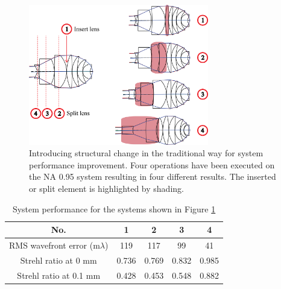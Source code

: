 \begin{figure}[h!]
    \centering
    \includegraphics[width=0.7\textwidth]{chapter-4/figures/Vollrath_NATradition.png}
    \caption{Introducing structural change in the traditional way for system performance improvement. Four operations have been executed on the NA 0.95 system resulting in four different results. The inserted or split element is highlighted by shading.}
    \label{fig: vollrathNAtrad}
\end{figure}

\setlength{\arrayrulewidth}{.5mm}
\setlength{\tabcolsep}{18pt}
\renewcommand{\arraystretch}{1.2}
\begin{table}[h!]
    \centering
    \captionsetup{justification=centering}
    \caption{System performance for the systems shown in Figure \ref{fig: vollrathNAtrad}}
    \label{table: vollrathNAtrad}
    \vspace{-1em}
    \begin{adjustbox}{max width=\textwidth, center}
    \begin{tabular}{c c c c c}
    \hline 
     No. & \textbf{1} & \textbf{2} & \textbf{3} & \textbf{4}\\ 
     \midrule
    RMS wavefront error (m$\lambda$) & 119 & 117 & 99 & 41 \\ 
    Strehl ratio at 0 mm & 0.736 & 0.769 & 0.832 & 0.985\\
    Strehl ratio at 0.1 mm & 0.428 & 0.453 & 0.548 & 0.882\\
    \hline
    \end{tabular}
    \end{adjustbox}
\end{table}

